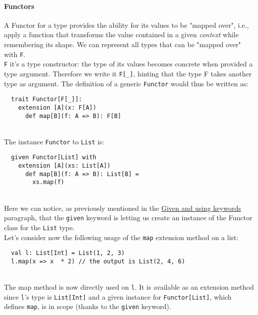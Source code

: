 \paragraph{Functors}
A Functor for a type provides the ability for its values to be "mapped over", i.e., apply a function that transforms the value contained in a given \textit{context} while remembering its shape.
We can represent all types that can be "mapped over" with \texttt{F}.\\
\texttt{F} it's a type constructor: the type of its values becomes concrete when provided a type argument.
Therefore we write it \texttt{F[\_]}, hinting that the type F takes another type as argument.
The definition of a generic \texttt{Functor} would thus be written as:
\begin{verbatim}
  trait Functor[F[_]]:
    extension [A](x: F[A])
      def map[B](f: A => B): F[B]
\end{verbatim}\mbox{}\\
The instance \texttt{Functor} to \texttt{List} is:
\begin{verbatim}
  given Functor[List] with
    extension [A](xs: List[A])
      def map[B](f: A => B): List[B] =
        xs.map(f)
\end{verbatim}\mbox{}\\
Here we can notice, as previously mentioned in the \hyperref[par:given-using]{Given and using keywords} paragraph, that the \texttt{given} keyword is letting us create an instance of the Functor class for the \texttt{List} type.\\
Let's consider now the following usage of the \texttt{map} extension method on a list:
\begin{verbatim}
  val l: List[Int] = List(1, 2, 3)
  l.map(x => x  * 2) // the output is List(2, 4, 6)
\end{verbatim}\mbox{}\\
The map method is now directly used on \texttt{l}. It is available as an extension method since \texttt{l}'s type is \texttt{List[Int]} and a given instance for \texttt{Functor[List]}, which defines \texttt{map}, is in scope (thanks to the \texttt{given} keyword).

